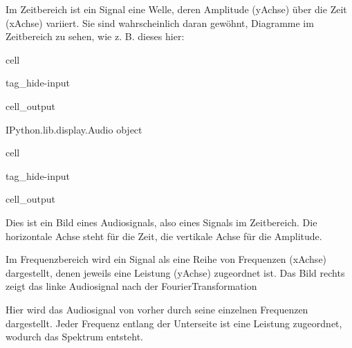 \documentclass[letterpaper,10pt,english]{jupyterBook}
\begin{document}
\sphinxAtStartPar
Im Zeitbereich ist ein Signal eine Welle, deren Amplitude (y\sphinxhyphen{}Achse) über die Zeit (x\sphinxhyphen{}Achse) variiert. Sie sind wahrscheinlich daran gewöhnt, Diagramme im Zeitbereich zu sehen, wie z. B. dieses hier:

\begin{sphinxuseclass}{cell}
\begin{sphinxuseclass}{tag_hide-input}\begin{sphinxVerbatimOutput}

\begin{sphinxuseclass}{cell_output}
\begin{sphinxVerbatim}[commandchars=\\\{\}]
\PYGZlt{}IPython.lib.display.Audio object\PYGZgt{}
\end{sphinxVerbatim}

\end{sphinxuseclass}\end{sphinxVerbatimOutput}

\end{sphinxuseclass}
\end{sphinxuseclass}
\begin{sphinxuseclass}{cell}
\begin{sphinxuseclass}{tag_hide-input}\begin{sphinxVerbatimOutput}

\begin{sphinxuseclass}{cell_output}
\noindent{}

\end{sphinxuseclass}\end{sphinxVerbatimOutput}

\end{sphinxuseclass}
\end{sphinxuseclass}
\sphinxAtStartPar
Dies ist ein Bild eines Audiosignals, also eines Signals im Zeitbereich. Die horizontale Achse steht für die Zeit, die vertikale Achse für die Amplitude.

\sphinxAtStartPar
Im Frequenzbereich wird ein Signal als eine Reihe von Frequenzen (x\sphinxhyphen{}Achse) dargestellt, denen jeweils eine Leistung (y\sphinxhyphen{}Achse) zugeordnet ist. Das Bild rechts zeigt das linke Audiosignal nach der Fourier\sphinxhyphen{}Transformation

\sphinxAtStartPar
Hier wird das Audiosignal von vorher durch seine einzelnen Frequenzen dargestellt. Jeder Frequenz entlang der Unterseite ist eine Leistung zugeordnet, wodurch das Spektrum entsteht.
\end{document}
